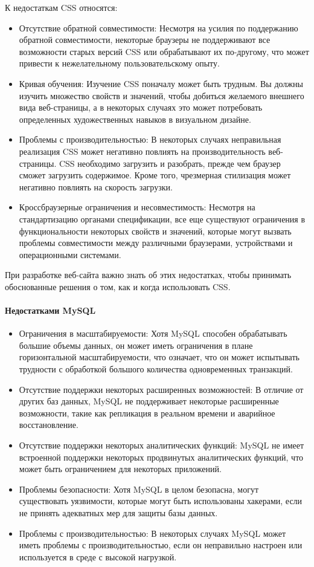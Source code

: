 К недостаткам CSS относятся:
\begin{itemize}
	\item Отсутствие обратной совместимости: Несмотря на усилия по поддержанию обратной совместимости, некоторые браузеры не поддерживают все возможности старых версий CSS или обрабатывают их по-другому, что может привести к нежелательному пользовательскому опыту.
	\item Кривая обучения: Изучение CSS поначалу может быть трудным. Вы должны изучить множество свойств и значений, чтобы добиться желаемого внешнего вида веб-страницы, а в некоторых случаях это может потребовать определенных художественных навыков в визуальном дизайне.
	\item Проблемы с производительностью: В некоторых случаях неправильная реализация CSS может негативно повлиять на производительность веб-страницы. CSS необходимо загрузить и разобрать, прежде чем браузер сможет загрузить содержимое. Кроме того, чрезмерная стилизация может негативно повлиять на скорость загрузки.
	\item Кроссбраузерные ограничения и несовместимость: Несмотря на стандартизацию органами спецификации, все еще существуют ограничения в функциональности некоторых свойств и значений, которые могут вызвать проблемы совместимости между различными браузерами, устройствами и операционными системами.
\end{itemize}

При разработке веб-сайта важно знать об этих недостатках, чтобы принимать обоснованные решения о том, как и когда использовать CSS\cite{Ncss}.

\paragraph{Недостатками MySQL}

\begin{itemize}
	\item Ограничения в масштабируемости: Хотя MySQL способен обрабатывать большие объемы данных, он может иметь ограничения в плане горизонтальной масштабируемости, что означает, что он может испытывать трудности с обработкой большого количества одновременных транзакций.
	\item Отсутствие поддержки некоторых расширенных возможностей: В отличие от других баз данных, MySQL не поддерживает некоторые расширенные возможности, такие как репликация в реальном времени и аварийное восстановление.
	\item Отсутствие поддержки некоторых аналитических функций: MySQL не имеет встроенной поддержки некоторых продвинутых аналитических функций, что может быть ограничением для некоторых приложений.
	\item Проблемы безопасности: Хотя MySQL в целом безопасна, могут существовать уязвимости, которые могут быть использованы хакерами, если не принять адекватных мер для защиты базы данных.
	\item Проблемы с производительностью: В некоторых случаях MySQL может иметь проблемы с производительностью, если он неправильно настроен или используется в среде с высокой нагрузкой.
\end{itemize}

